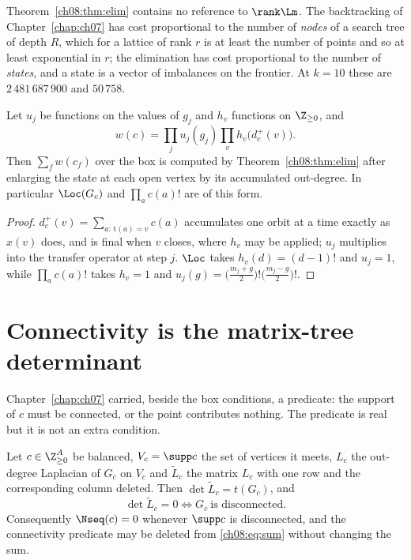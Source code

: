 \begin{remark}\label{ch08:rem:cost}
Theorem~\ref{ch08:thm:elim} contains no reference to $\rank\Lm$. The backtracking of Chapter~\ref{chap:ch07}
has cost proportional to the number of \emph{nodes} of a search tree of depth $R$, which for a
lattice of rank $r$ is at least the number of points and so at least exponential in $r$; the
elimination has cost proportional to the number of \emph{states}, and a state is a vector of
imbalances on the frontier. At $k=10$ these are $2\,481\,687\,900$ and $50\,758$.
\end{remark}

\begin{proposition}\label{ch08:prop:weights}
Let $u_j$ be functions on the values of $g_j$ and $h_v$ functions on $\Z_{\ge0}$, and
\[
w(c)=\prod_j u_j(g_j)\prod_v h_v\big(d^+_c(v)\big).
\]
Then $\sum_f w(c_f)$ over the box is computed by Theorem~\ref{ch08:thm:elim} after enlarging the
state at each open vertex by its accumulated out-degree. In particular
$\Loc(G_c)$ and $\prod_a c(a)!$ are of this form.
\end{proposition}

\begin{proof}
$d^+_c(v)=\sum_{a:\,\mathrm{t}(a)=v}c(a)$ accumulates one orbit at a time exactly as $x(v)$
does, and is final when $v$ closes, where $h_v$ may be applied; $u_j$ multiplies into the
transfer operator at step $j$. $\Loc$ takes $h_v(d)=(d-1)!$ and $u_j=1$, while
$\prod_a c(a)!$ takes $h_v=1$ and $u_j(g)=\big(\tfrac{m_j+g}{2}\big)!\big(\tfrac{m_j-g}{2}\big)!$.
\end{proof}

\section{Connectivity is the matrix-tree determinant}\label{ch08:sec:conn}

Chapter~\ref{chap:ch07} carried, beside the box conditions, a predicate: the support of $c$ must be connected,
or the point contributes nothing. The predicate is real but it is not an extra condition.

\begin{lemma}\label{ch08:lem:conn}
Let $c\in\Z_{\ge0}^A$ be balanced, $V_c=\supp c$ the set of vertices it meets, $L_c$ the
out-degree Laplacian of $G_c$ on $V_c$ and $\widetilde L_c$ the matrix $L_c$ with one row and
the corresponding column deleted. Then $\det\widetilde L_c=t(G_c)$, and
\[
\det\widetilde L_c=0\iff G_c\ \text{is disconnected.}
\]
Consequently $\Nseq(c)=0$ whenever $\supp c$ is disconnected, and the connectivity predicate
may be deleted from \eqref{ch08:eq:sum} without changing the sum.
\end{lemma}

